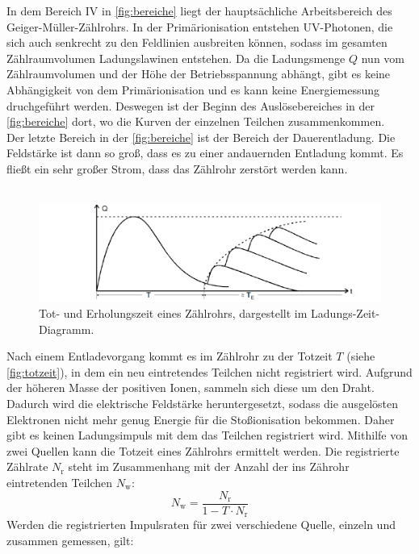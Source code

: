 In dem Bereich IV in \autoref{fig:bereiche} liegt der hauptsächliche Arbeitsbereich des Geiger-Müller-Zählrohrs. 
In der Primärionisation entstehen UV-Photonen, die sich auch senkrecht zu den Feldlinien ausbreiten können, sodass im gesamten Zählraumvolumen Ladungslawinen entstehen.
Da die Ladungsmenge $Q$ nun vom Zählraumvolumen und der Höhe der Betriebsspannung abhängt, gibt es keine Abhängigkeit von dem Primärionisation und es kann keine Energiemessung druchgeführt werden.
Deswegen ist der Beginn des Auslösebereiches in der \autoref{fig:bereiche} dort, wo die Kurven der einzelnen Teilchen zusammenkommen.\\
Der letzte Bereich in der \autoref{fig:bereiche} ist der Bereich der Dauerentladung.
Die Feldstärke ist dann so groß, dass es zu einer andauernden Entladung kommt.
Es fließt ein sehr großer Strom, dass das Zählrohr zerstört werden kann.\\
\\
\begin{figure}
    \centering
    \includegraphics[width=\textwidth]{content/totzeit.pdf}
    \caption{Tot- und Erholungszeit eines Zählrohrs, dargestellt im Ladungs-Zeit-Diagramm.\cite{anleitung}}
    \label{fig:totzeit}
\end{figure}
Nach einem Entladevorgang kommt es im Zählrohr zu der Totzeit $T$ (siehe \autoref{fig:totzeit}), in dem ein neu eintretendes Teilchen nicht registriert wird.
Aufgrund der höheren Masse der positiven Ionen, sammeln sich diese um den Draht.
Dadurch wird die elektrische Feldstärke heruntergesetzt, sodass die ausgelösten Elektronen nicht mehr genug Energie für die Stoßionisation bekommen.
Daher gibt es keinen Ladungsimpuls mit dem das Teilchen registriert wird.
Mithilfe von zwei Quellen kann die Totzeit eines Zählrohrs ermittelt werden. 
Die registrierte Zählrate $N_{\text{r}}$ steht im Zusammenhang mit der Anzahl der ins Zährohr eintretenden Teilchen $N_{\text{w}}$:
\begin{equation*}
    N_{\text{w}} = \frac{N_{\text{r}}}{1-T\cdot N_{\text{r}}}
\end{equation*}
Werden die registrierten Impulsraten für zwei verschiedene Quelle, einzeln und zusammen gemessen, gilt:
